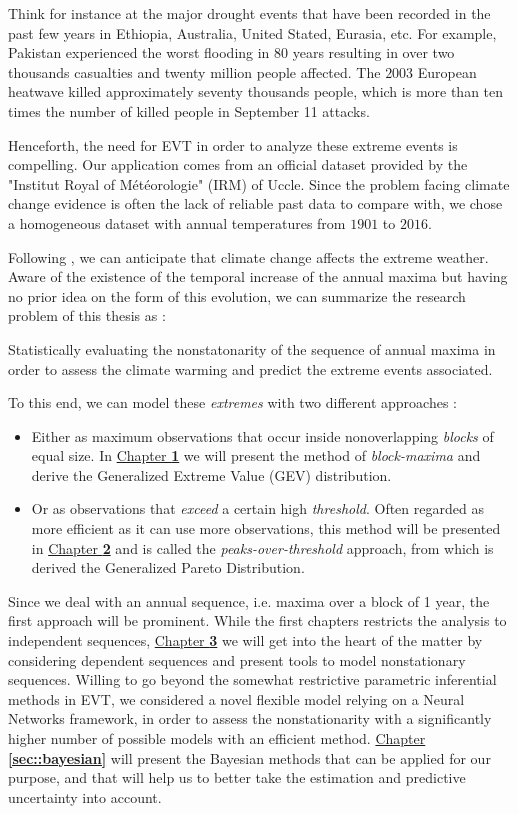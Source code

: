 \documentclass[11pt,a4paper,openany, twosided]{book}
\begin{document}
Think for instance at the major drought events that have been recorded in the past few years in Ethiopia, Australia, United Stated, Eurasia, etc. For example, Pakistan experienced the worst flooding in $80$ years resulting in over two thousands casualties and twenty million people affected. The $2003$ European heatwave killed approximately seventy thousands people, which is more than ten times the number of killed people in September 11 attacks. 


Henceforth, the need for EVT in order to analyze these extreme events is compelling.
Our application comes from an official dataset provided by the "Institut Royal of Météorologie" (IRM) of Uccle. 
Since the problem facing climate change evidence is often the lack of reliable past data to compare with, we chose a homogeneous dataset with annual temperatures from $1901$ to $2016$. 


Following \citet{kharin_changes_2007}, we can anticipate that climate change affects the extreme weather. Aware of the existence of the temporal increase of the annual maxima but having no prior idea on the form of this evolution, we can summarize the research problem of this thesis as : 
\vspace{0.1cm}
\begin{tcolorbox}%
	Statistically evaluating the nonstatonarity of the sequence of annual maxima in order to assess the climate warming and predict the extreme events associated. 
\end{tcolorbox}
To this end, we can model these \emph{extremes} with two different approaches : 

\begin{itemize}
	\item Either as maximum observations that occur inside nonoverlapping \emph{blocks} of equal size.
	In \hyperref[sec::1]{Chapter \textbf{1}} we will present the method of \emph{block-maxima} and derive the Generalized Extreme Value (GEV) distribution.
	\item Or as observations that \emph{exceed} a certain high \emph{threshold}. Often regarded as more efficient as it can use more observations, this method will be presented in  \hyperref[sec::2]{Chapter \textbf{2}} and is called the \emph{peaks-over-threshold} approach, from which is derived the Generalized Pareto Distribution.
\end{itemize}
Since we deal with an annual sequence, i.e.  maxima over a block of 1 year, the first approach will be prominent.
While the first chapters restricts the analysis to independent sequences, \hyperref[sec::3]{Chapter \textbf{3}} we will get into the heart of the matter by considering dependent sequences and present tools to model nonstationary sequences.
Willing to go beyond the somewhat restrictive parametric inferential methods in EVT, we considered a novel flexible model relying on a Neural Networks framework, in order to assess the nonstationarity with a significantly higher number of possible models with an efficient method. 
\hyperref[sec::bayesian]{Chapter \textbf{\ref{sec::bayesian}}} will present the Bayesian methods that can be applied for our purpose, and that will help us to better take the estimation and predictive uncertainty into account.
\end{document}
